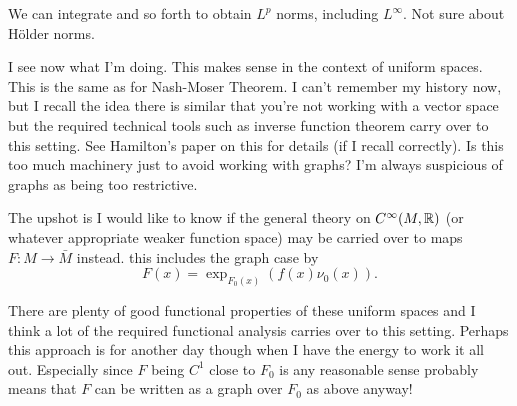 \documentclass{amsart}
\begin{document}
We can integrate and so forth to obtain \(L^p\) norms, including \(L^{\infty}\). Not sure about H\"older norms. 

I see now what I'm doing. This makes sense in the context of uniform spaces. This is the same as for Nash-Moser Theorem. I can't remember my history now, but I recall the idea there is similar that you're not working with a vector space but the required technical tools such as inverse function theorem carry over to this setting. See Hamilton's paper on this for details (if I recall correctly). Is this too much machinery just to avoid working with graphs? I'm always suspicious of graphs as being too restrictive.

The upshot is I would like to know if the general theory on \(C^{\infty}(M, \mathbb{R})\) (or whatever appropriate weaker function space) may be carried over to maps \(F : M \to \bar{M}\) instead. this includes the graph case by
\[
F(x) = \exp_{F_0(x)} (f(x) \nu_0(x)).
\]

There are plenty of good functional properties of these uniform spaces and I think a lot of the required functional analysis carries over to this setting. Perhaps this approach is for another day though when I have the energy to work it all out. Especially since \(F\) being \(C^1\) close to \(F_0\) is any reasonable sense probably means that \(F\) can be written as a graph over \(F_0\) as above anyway!



\end{document}
